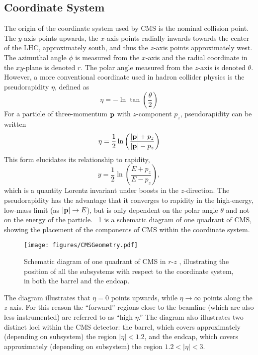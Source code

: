 \subsection{Coordinate System}
The origin of the coordinate system used by CMS is the nominal \pp collision point.
The $y$-axis points upwards, the $x$-axis points radially inwards towards the center of the LHC, approximately south, and thus the $z$-axis points approximately west.
The azimuthal angle $\phi$ is measured from the $x$-axis and the radial coordinate in the $xy$-plane is denoted $r$.
The polar angle measured from the $z$-axis is denoted $\theta$.
However, a more conventional coordinate used in hadron collider physics is the pseudorapidity $\eta$, defined as
\begin{equation}
  \eta = -\ln\tan\left(\frac{\theta}{2}\right)
  \label{eq:eta}
\end{equation}
For a particle of three-momentum $\mathbf{p}$ with $z$-component $p_z$, pseudorapidity can be written
\begin{equation}
  \eta = \frac12\ln\left(\frac{|\mathbf{p}|+p_z}{|\mathbf{p}|-p_z}\right)
  \label{eq:eta_p}
\end{equation}
This form elucidates its relationship to rapidity,
\begin{equation}
  y = \frac12\ln\left(\frac{E+p_z}{E-p_z}\right),
  \label{eq:rap}
\end{equation}
which is a quantity Lorentz invariant under boosts in the $z$-direction.
The pseudorapidity has the advantage that it converges to rapidity in the high-energy, low-mass limit (as $|\mathbf{p}|\to E$), but is only dependent on the polar angle $\theta$ and not on the energy of the particle.
\Fig~\ref{cms:quadrant} is a schematic diagram of one quadrant of CMS, showing the placement of the components of CMS within the coordinate system.
\begin{figure}[htpb]
  \centering
  \texttt{[image: figures/CMSGeometry.pdf]}
  \caption{Schematic diagram of one quadrant of CMS in $r$-$z$ \cite{Sirunyan:2018fpa}, illustrating the position of all the subsystems with respect to the coordinate system, in both the barrel and the endcap.}
  \label{cms:quadrant}
\end{figure}

The diagram illustrates that $\eta = 0$ points upwards, while $\eta \to \infty$ points along the $z$-axis.
For this reason the ``forward'' regions close to the beamline (which are also less instrumented) are referred to as ``high $\eta$.''
The diagram also illustrates two distinct loci within the CMS detector: the barrel, which covers approximately (depending on subsystem) the region $|\eta| < 1.2$, and the endcap, which covers approximately (depending on subsystem) the region $1.2 < |\eta| < 3$.

